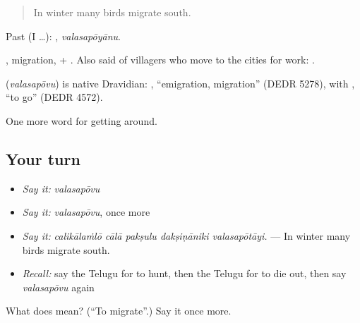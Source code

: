\begin{quote}
In winter many birds migrate south.
\end{quote}

Past (I …): , \emph{valasapōyānu}.

, migration, + . Also said of villagers who move to the cities for work:   .

\begin{cousinweb}
\textbf{} (\emph{valasapōvu}) is native Dravidian: , \textquotedblleft{}emigration, migration\textquotedblright{} (DEDR 5278), with , \textquotedblleft{}to go\textquotedblright{} (DEDR 4572).
\end{cousinweb}

\begin{grammarlens}[title={What you've built}]
One more word for getting around.
\end{grammarlens}

\subsection*{Your turn}
\begin{itemize}
\raggedright
  \item \emph{Say it:} \emph{valasapōvu}
  \item \emph{Say it:} \emph{valasapōvu}, once more
  \item \emph{Say it:} \emph{calikālaṁlō cālā pakṣulu dakṣiṇāniki valasapōtāyi.} — In winter many birds migrate south.
  \item \emph{Recall:} say the Telugu for to hunt, then the Telugu for to die out, then say \emph{valasapōvu} again
\end{itemize}

\begin{tcolorbox}[breakable,colback=teal!4,colframe=teal!35!black,title={Before you move on}]
What does  mean? (\textquotedblleft{}To migrate\textquotedblright{}.) Say it once more.
\end{tcolorbox}
